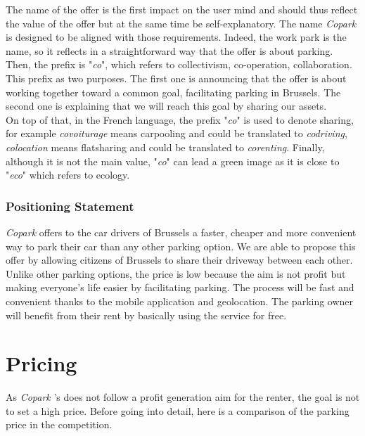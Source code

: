 \documentclass[12pt,a4paper,oneside]{book}
\newcommand{\bp}{\textit{Copark }}
\begin{document}
The name of the offer is the first impact on the user mind and should thus reflect the value of the offer but at the same time be self-explanatory. The name \bp is designed to be aligned with those requirements. Indeed, the work park is the name, so it reflects in a straightforward way that the offer is about parking. Then, the prefix is "\textit{co}", which refers to collectivism, co-operation, collaboration. This prefix as two purposes. The first one is announcing that the offer is about working together toward a common goal, facilitating parking in Brussels. The second one is explaining that we will reach this goal by sharing our assets.\\
On top of that, in the French language, the prefix "\textit{co}" is used to denote sharing, for example \textit{covoiturage} means carpooling and could be translated to \textit{codriving}, \textit{colocation} means flatsharing and could be translated to \textit{corenting}. Finally, although it is not the main value, "\textit{co}" can lead a green image as it is close to "\textit{eco}" which refers to ecology.

\subsubsection{Positioning Statement}

\bp offers to the car drivers of Brussels a faster, cheaper and more convenient way to park their car than any other parking option. We are able to propose this offer by allowing citizens of Brussels to share their driveway between each other. Unlike other parking options, the price is low because the aim is not profit but making everyone's life easier by facilitating parking. The process will be fast and convenient thanks to the mobile application and geolocation. The parking owner will benefit from their rent by basically using the service for free. 

\section{Pricing}
\label{priceana}

As \bp's does not follow a profit generation aim for the renter, the goal is not to set a high price. Before going into detail, here is a comparison of the parking price in the competition.
\end{document}
